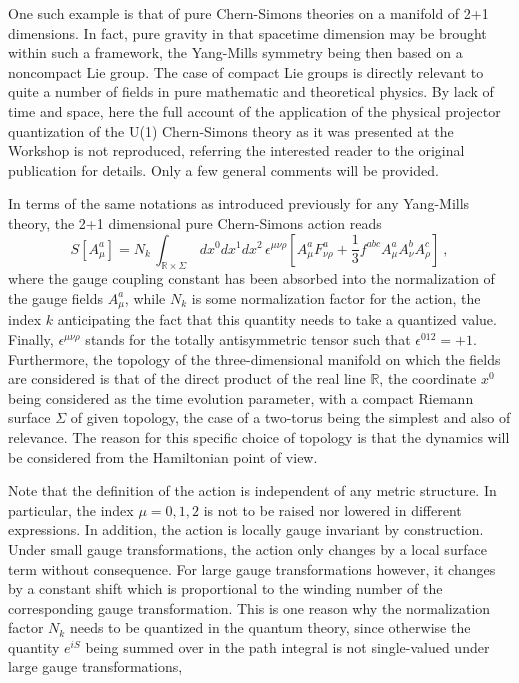 \documentclass[a4paper,11pt]{article}
\def\R{\mathbb R}
\begin{document}
One such example is that of pure Chern-Simons theories on a manifold of 2+1 
dimensions.\cite{Wit2}
In fact, pure gravity in that spacetime dimension may be brought within
such a framework, the Yang-Mills symmetry being then based on a noncompact
Lie group.\cite{Wit3} The case of compact Lie groups is directly relevant 
to quite a number of fields in pure mathematic and theoretical 
physics.\cite{Wit2,Goldin} By lack
of time and space, here the full account of the application of the physical
projector quantization of the U(1) Chern-Simons theory as it was presented
at the Workshop is not reproduced, referring the interested reader
to the original publication for details.\cite{JG2bis,JG9} Only a few 
general comments will be provided.

In terms of the same notations as introduced previously for any Yang-Mills
theory, the 2+1 dimensional pure Chern-Simons action reads
\begin{equation}
S[A^a_\mu]=N_k\,\int_{\R\times\Sigma}\,dx^0dx^1dx^2\,
\epsilon^{\mu\nu\rho}\left[A^a_\mu F^a_{\nu\rho}+\frac{1}{3}f^{abc}
A^a_\mu A^b_\nu A^c_\rho\right]\ ,
\end{equation}
where the gauge coupling constant has been absorbed into the normalization
of the gauge fields $A^a_\mu$, while $N_k$ is some normalization factor
for the action, the index $k$ anticipating the fact that this quantity
needs to take a quantized value. Finally, $\epsilon^{\mu\nu\rho}$ stands
for the totally antisymmetric tensor such that $\epsilon^{012}=+1$.
Furthermore, the topology of the three-dimensional manifold on which the
fields are considered is that of the direct product of the real line $\R$,
the coordinate $x^0$ being considered as the time evolution parameter,
with a compact Riemann surface $\Sigma$ of given topology, the case of
a two-torus being the simplest and also of relevance. The reason for this
specific choice of topology is that the dynamics will be considered
from the Hamiltonian point of view. 

Note that the definition of the action is independent of any metric
structure. In particular, the index $\mu=0,1,2$ is not to be raised nor
lowered in different expressions. In addition, the action is locally gauge
invariant by construction. Under small gauge transformations, the action
only changes by a local surface term without consequence. For large gauge
transformations however, it changes by a constant shift which is
proportional to the winding number of the corresponding gauge transformation.
This is one reason why the normalization factor $N_k$ needs to be quantized
in the quantum theory, since otherwise the quantity $e^{iS}$ being
summed over in the path integral is not single-valued under large gauge
transformations,
\end{document}
